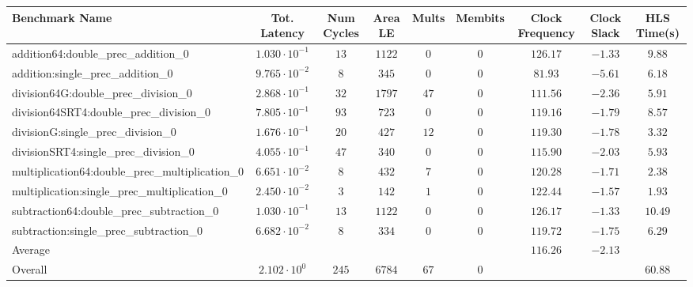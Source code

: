 \begin{tabular}{|l|c|c|c|c|c|c|c|c|}
\hline
Benchmark Name                                   & Tot. Latency            & Num Cycles & Area LE  & Mults  & Membits & Clock Frequency & Clock Slack & HLS Time(s) \\
\hline
addition64:double\_prec\_addition\_0             & $ 1.030 \cdot 10^{-1} $ & $ 13     $ & $ 1122 $ & $ 0  $ & $ 0   $ & $ 126.17      $ & $ -1.33   $ & $ 9.88    $ \\
addition:single\_prec\_addition\_0               & $ 9.765 \cdot 10^{-2} $ & $ 8      $ & $ 345  $ & $ 0  $ & $ 0   $ & $ 81.93       $ & $ -5.61   $ & $ 6.18    $ \\
division64G:double\_prec\_division\_0            & $ 2.868 \cdot 10^{-1} $ & $ 32     $ & $ 1797 $ & $ 47 $ & $ 0   $ & $ 111.56      $ & $ -2.36   $ & $ 5.91    $ \\
division64SRT4:double\_prec\_division\_0         & $ 7.805 \cdot 10^{-1} $ & $ 93     $ & $ 723  $ & $ 0  $ & $ 0   $ & $ 119.16      $ & $ -1.79   $ & $ 8.57    $ \\
divisionG:single\_prec\_division\_0              & $ 1.676 \cdot 10^{-1} $ & $ 20     $ & $ 427  $ & $ 12 $ & $ 0   $ & $ 119.30      $ & $ -1.78   $ & $ 3.32    $ \\
divisionSRT4:single\_prec\_division\_0           & $ 4.055 \cdot 10^{-1} $ & $ 47     $ & $ 340  $ & $ 0  $ & $ 0   $ & $ 115.90      $ & $ -2.03   $ & $ 5.93    $ \\
multiplication64:double\_prec\_multiplication\_0 & $ 6.651 \cdot 10^{-2} $ & $ 8      $ & $ 432  $ & $ 7  $ & $ 0   $ & $ 120.28      $ & $ -1.71   $ & $ 2.38    $ \\
multiplication:single\_prec\_multiplication\_0   & $ 2.450 \cdot 10^{-2} $ & $ 3      $ & $ 142  $ & $ 1  $ & $ 0   $ & $ 122.44      $ & $ -1.57   $ & $ 1.93    $ \\
subtraction64:double\_prec\_subtraction\_0       & $ 1.030 \cdot 10^{-1} $ & $ 13     $ & $ 1122 $ & $ 0  $ & $ 0   $ & $ 126.17      $ & $ -1.33   $ & $ 10.49   $ \\
subtraction:single\_prec\_subtraction\_0         & $ 6.682 \cdot 10^{-2} $ & $ 8      $ & $ 334  $ & $ 0  $ & $ 0   $ & $ 119.72      $ & $ -1.75   $ & $ 6.29    $ \\
\hline
Average                                          & $                     $ & $        $ & $      $ & $    $ & $     $ & $ 116.26      $ & $ -2.13   $ & $         $ \\
\hline
Overall                                          & $ 2.102 \cdot 10^{0}  $ & $ 245    $ & $ 6784 $ & $ 67 $ & $ 0   $ & $             $ & $         $ & $ 60.88   $ \\
\hline
\end{tabular}
